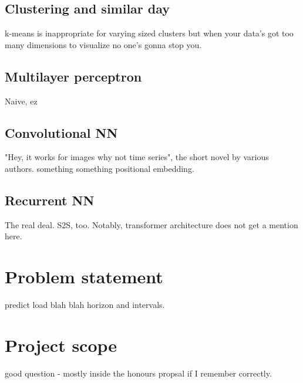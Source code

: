 \subsection{Clustering and similar day}
k-means is inappropriate for varying sized clusters but when your data's got too many dimensions to visualize no one's gonna stop you.

\subsection{Multilayer perceptron}
Naive, ez

\subsection{Convolutional NN}
"Hey, it works for images why not time series", the short novel by various authors.
something something positional embedding.

\subsection{Recurrent NN}
The real deal. S2S, too. Notably, transformer architecture does not get a mention here.

\section{Problem statement}
predict load blah blah horizon and intervals.

\section{Project scope}
good question - mostly inside the honours propsal if I remember correctly.